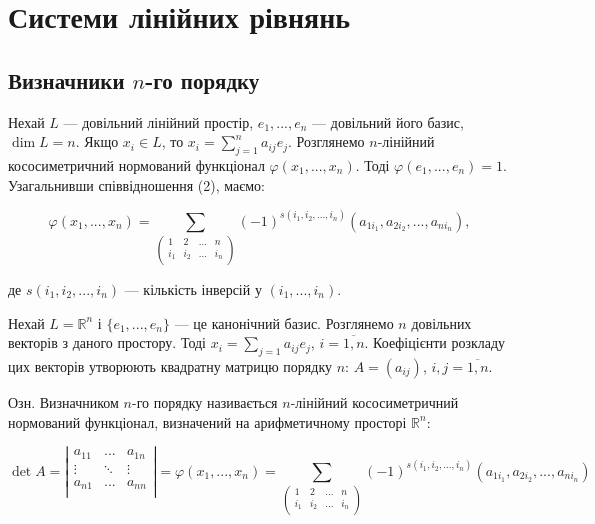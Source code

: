 \chapter{Системи лінійних рівнянь}


\section{Визначники $n$-го порядку}

Нехай $L$ --- довільний лінійний простір, $e_1, ..., e_n$ --- довільний його базис,
$\dim L = n$. Якщо $x_i \in L$, то $x_i = \sum\limits_{j=1}^n a_{ij} e_j$. Розглянемо
$n$-лінійний кососиметричний нормований функціонал $\varphi(x_1, ..., x_n)$. Тоді $\varphi(e_1, ..., e_n) = 1$.
Узагальнивши співвідношення (2), маємо:

$$\varphi(x_1, ..., x_n) = \sum\limits_{ \begin{pmatrix} 1 & 2 & ... & n \\ i_1 & i_2 & ... & i_n \\ \end{pmatrix} } (-1)^{s(i_1, i_2, ..., i_n)} (a_{1 i_1}, a_{2 i_2}, ..., a_{n i_n}),$$

де $s(i_1, i_2, ..., i_n)$ --- кількість інверсій у $(i_1, ..., i_n)$. 

Нехай $L = \mathbb{R}^n$ і $\{e_1, ..., e_n\}$ --- це канонічний базис. Розглянемо $n$ довільних
векторів з даного простору. Тоді $x_i = \sum\limits_{j=1} a_{ij} e_j$, $i = \overline{1,n}$.
Коефіцієнти розкладу цих векторів утворюють квадратну матрицю порядку $n$: $A = (a_{ij})$, $i,j = \overline{1,n}$.



Озн. Визначником $n$-го порядку називається $n$-лінійний кососиметричний
нормований функціонал, визначений на арифметичному просторі $\mathbb{R}^n$:

$$\det A = \left| \begin{matrix}
	a_{11} & ...    & a_{1n} \\
	\vdots & \ddots & \vdots \\
	a_{n1} & ...    & a_{nn} \\
\end{matrix} \right| = \varphi(x_1, ..., x_n) 
= \sum\limits_{ \begin{pmatrix} 1 & 2 & ... & n \\ i_1 & i_2 & ... & i_n \\ \end{pmatrix} }
	(-1)^{s(i_1, i_2, ..., i_n)} (a_{1 i_1}, a_{2 i_2}, ..., a_{n i_n})$$

